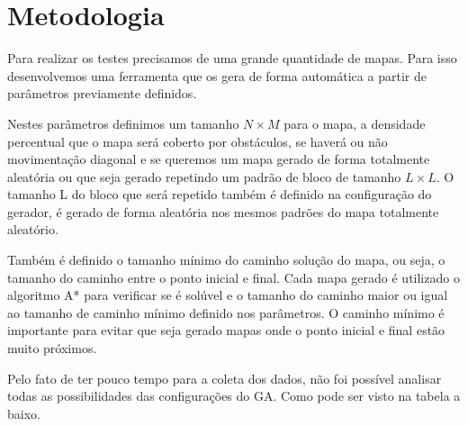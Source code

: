  \chapter[Metodologia]{Metodologia}

Para realizar os testes precisamos de uma grande quantidade de mapas. Para isso desenvolvemos uma ferramenta que os gera de forma automática a partir de parâmetros previamente definidos.
 
Nestes parâmetros definimos um tamanho $N\times M$ para o mapa, a densidade percentual que o mapa será coberto por obstáculos, se haverá ou não movimentação diagonal e se queremos um mapa gerado de forma totalmente aleatória ou que seja gerado repetindo um padrão de bloco de tamanho $L\times L$.  
O tamanho L do bloco que será repetido também é definido na configuração do gerador, é gerado de forma aleatória nos mesmos padrões do mapa totalmente aleatório. 
 
Também é definido o tamanho mínimo do caminho solução do mapa, ou seja, o tamanho do caminho entre o ponto inicial e final.
Cada mapa gerado é utilizado o algoritmo A* para verificar se é solúvel e o tamanho do caminho maior ou igual ao tamanho de caminho mínimo  definido nos parâmetros. O caminho mínimo é importante para evitar que seja gerado mapas onde o ponto inicial e final estão muito próximos.

Pelo fato de ter pouco tempo para a coleta dos dados, não foi possível analisar todas as possibilidades das configurações do GA. Como pode ser visto na tabela a baixo.

